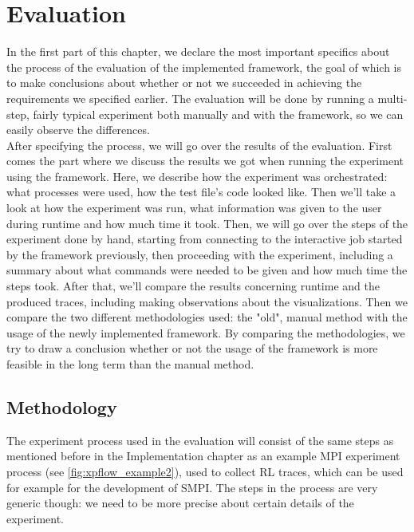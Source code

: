 



\chapter{Evaluation}
\label{Chapter5}

\label{sec:evaluation_plan}
In the first part of this chapter, we declare the most important
specifics about the process of the evaluation of the
implemented framework, the goal of which is to make
conclusions about whether or not we succeeded in achieving the
requirements we specified earlier. The evaluation will be done by
running a multi-step, fairly typical experiment both manually and with
the framework, so we can easily observe the differences.\\[0.3cm]
After specifying the process, we will go over the results of the
evaluation. First comes the part where we discuss the
results we got when running the experiment using the framework. Here,
we describe how the experiment was orchestrated: what processes were
used, how the test file's code looked like. Then we'll take a look at
how the experiment was run, what information was given to the user
during runtime and how much time it took. Then, we will go over the
steps of the experiment done by hand, starting from connecting to the
interactive job started by the framework previously, then proceeding
with the experiment, including a summary about what commands
were needed to be given and how much time the steps took. After that,
we'll compare the results concerning runtime and the produced traces,
including making observations about the visualizations. Then we
compare the two different methodologies used: the "old", manual method
with the usage of the newly implemented framework. By comparing the
methodologies, we try to draw a conclusion whether or not the usage of
the framework is more feasible in the long term than the manual
method.
\section{Methodology}
The experiment process used in the evaluation will consist of the same
steps as mentioned before in the Implementation chapter as an example
MPI experiment process (see \ref{fig:xpflow_example2}), used to collect
RL traces, which can be used for example for the development of
SMPI. The steps in the process are very generic though: we need to be
more precise about certain details of the experiment.
